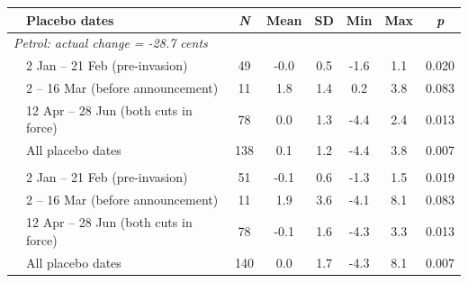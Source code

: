 \begin{tabular}{llcccccc}
\toprule
 & Placebo dates & \textit{N} & Mean & SD & Min & Max & \textit{p} \\
\midrule
\multicolumn{8}{l}{\textit{Petrol: actual change = -28.7 cents}} \\
 & 2 Jan -- 21 Feb (pre-invasion) &  49 &  -0.0 &  0.5 &  -1.6 &   1.1 & 0.020 \\
 & 2 -- 16 Mar (before announcement) &  11 &   1.8 &  1.4 &   0.2 &   3.8 & 0.083 \\
 & 12 Apr -- 28 Jun (both cuts in force) &  78 &   0.0 &  1.3 &  -4.4 &   2.4 & 0.013 \\
\addlinespace
 & All placebo dates & 138 &   0.1 &  1.2 &  -4.4 &   3.8 & 0.007 \\
\addlinespace
\multicolumn{8}{l}{\textit{Diesel: actual change = -35.5 cents}} \\
 & 2 Jan -- 21 Feb (pre-invasion) &  51 &  -0.1 &  0.6 &  -1.3 &   1.5 & 0.019 \\
 & 2 -- 16 Mar (before announcement) &  11 &   1.9 &  3.6 &  -4.1 &   8.1 & 0.083 \\
 & 12 Apr -- 28 Jun (both cuts in force) &  78 &  -0.1 &  1.6 &  -4.3 &   3.3 & 0.013 \\
\addlinespace
 & All placebo dates & 140 &   0.0 &  1.7 &  -4.3 &   8.1 & 0.007 \\
\bottomrule
\end{tabular}
